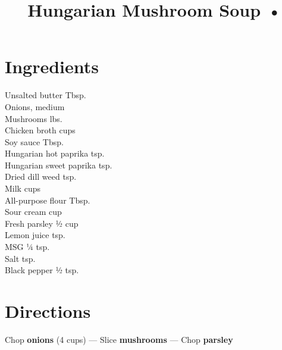 \documentclass[11pt,letterpaper]{article}
\title{Hungarian Mushroom Soup •}
\author{}
\date{}
\begin{document}
\maketitle
\thispagestyle{empty}

\section*{Ingredients}
\setlength{\columnsep}{20pt}
\begin{multicols}{2}
\noindent
    Unsalted butter  Tbsp. \\
    Onions, medium  \\
    Mushrooms  lbs. \\
    Chicken broth  cups \\
    Soy sauce  Tbsp. \\
    Hungarian hot paprika  tsp. \\
    Hungarian sweet paprika  tsp. \\
    Dried dill weed  tsp. \\
    \columnbreak
    Milk  cups \\
    All-purpose flour  Tbsp. \\
    Sour cream  cup \\
    Fresh parsley \dotfill ½ cup \\
    Lemon juice  tsp. \\
    MSG \dotfill ¼ tsp. \\
    Salt  tsp. \\
    Black pepper \dotfill ½ tsp. \\
\end{multicols}

\section*{Directions}

\noindent
Chop \textbf{onions} (4 cups) ---
Slice \textbf{mushrooms} ---
Chop \textbf{parsley}
\end{document}
